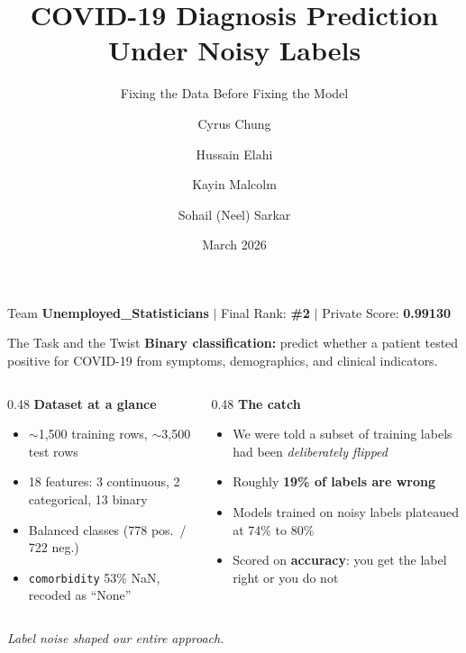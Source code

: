 \documentclass[aspectratio=169, 11pt]{beamer}
\title{COVID-19 Diagnosis Prediction Under Noisy Labels}
\subtitle{Fixing the Data Before Fixing the Model}
\author{Cyrus Chung \and Hussain Elahi \and Kayin Malcolm \and Sohail (Neel) Sarkar}
\institute{STA314, University of Toronto}
\date{March 2026}
\begin{document}
\begin{frame}
\titlepage
\begin{center}
  \vspace{-1.2em}
  {\normalsize Team \textbf{Unemployed\_Statisticians} \quad $\mid$ \quad Final Rank: \textbf{\#2} \quad $\mid$ \quad Private Score: \textbf{0.99130}}
\end{center}
\end{frame}

\begin{frame}{The Task and the Twist}
\textbf{Binary classification:} predict whether a patient tested positive for COVID-19 from symptoms, demographics, and clinical indicators.

\vspace{0.4em}
\begin{columns}[T]
\begin{column}{0.48\textwidth}
  \textbf{Dataset at a glance}
  \begin{itemize}
    \item $\sim$1{,}500 training rows, $\sim$3{,}500 test rows
    \item 18 features: 3 continuous, 2 categorical, 13 binary
    \item Balanced classes (778 pos.\ / 722 neg.)
    \item \texttt{comorbidity} 53\% NaN, recoded as ``None''
  \end{itemize}
\end{column}
\begin{column}{0.48\textwidth}
  \textbf{The catch}
  \begin{itemize}
    \item We were told a subset of training labels had been \textit{deliberately flipped}
    \item Roughly \textbf{19\% of labels are wrong}
    \item Models trained on noisy labels plateaued at 74\% to 80\%
    \item Scored on \textbf{accuracy}: you get the label right or you do not
  \end{itemize}
\end{column}
\end{columns}

\vspace{0.4em}
\centering
\textit{Label noise shaped our entire approach.}
\end{frame}
\end{document}
